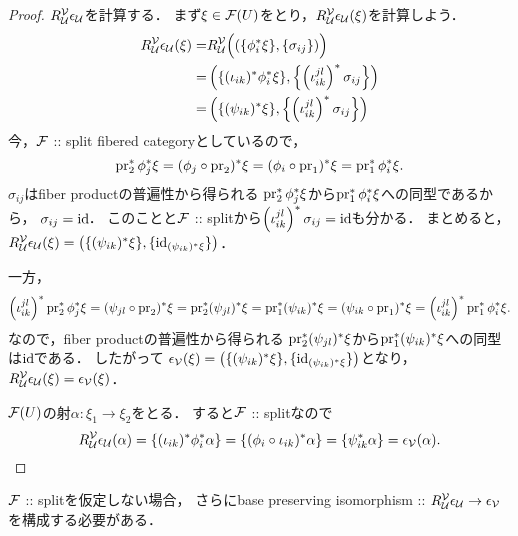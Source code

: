 \documentclass[a4paper, dvipdfmx]{jsarticle}
\begin{document}
\begin{proof}
    $R_{\covU}^{\covV}\epsilon_{\covU}$を計算する．
    まず$\xi \in \stF(U)$をとり，$R_{\covU}^{\covV}\epsilon_{\covU}(\xi)$を計算しよう．
    \begin{align*}
        R_{\covU}^{\covV}\epsilon_{\covU}(\xi)
        =&  R_{\covU}^{\covV}\Big( (\{\phi_i^*\xi\}, \{\sigma_{ij}\}) \Big) \\
        =&  \left(\{(\iota_{ik})^*\phi_i^*\xi\}, \left\{\left(\iota_{ik}^{jl}\right)^*\sigma_{ij} \right\}\right) \\
        =&  \left(\{(\psi_{ik})^*\xi\}, \left\{\left(\iota_{ik}^{jl}\right)^*\sigma_{ij} \right\}\right)
    \end{align*}
    今，$\stF$ :: split fibered categoryとしているので，
    \[ \pr_2^*\phi_j^* \xi=(\phi_j \circ \pr_2)^*\xi=(\phi_i \circ \pr_1)^*\xi=\pr_1^*\phi_i^* \xi. \]
    $\sigma_{ij}$はfiber productの普遍性から得られる
    $\pr_2^*\phi_j^* \xi$から$\pr_1^*\phi_i^* \xi$への同型であるから，
    $\sigma_{ij}=\id$．
    このことと$\stF$ :: splitから$\left(\iota_{ik}^{jl}\right)^*\sigma_{ij}=\id$も分かる．
    まとめると，
    $R_{\covU}^{\covV}\epsilon_{\covU}(\xi)=\left(\{(\psi_{ik})^*\xi\}, \{\id[(\psi_{ik})^*\xi]\}\right)$．

    一方，
    \[
        \left(\iota_{ik}^{jl}\right)^*\pr_2^*\phi_j^* \xi
        =(\psi_{jl} \circ \pr_2)^*\xi
        =\pr_2^*(\psi_{jl})^*\xi
        =\pr_1^*(\psi_{ik})^*\xi
        =(\psi_{ik} \circ \pr_1)^*\xi
        =\left(\iota_{ik}^{jl}\right)^*\pr_1^*\phi_i^* \xi.
    \]
    なので，fiber productの普遍性から得られる
    $\pr_2^*(\psi_{jl})^*\xi$から$\pr_1^*(\psi_{ik})^*\xi$への同型は$\id$である．
    したがって
    $\epsilon_{\covV}(\xi)=\left(\{(\psi_{ik})^*\xi\}, \{\id[(\psi_{ik})^*\xi]\}\right)$となり，
    $R_{\covU}^{\covV}\epsilon_{\covU}(\xi)=\epsilon_{\covV}(\xi)$．
    
    $\stF(U)$の射$\alpha \colon \xi_1 \to \xi_2$をとる．
    すると$\stF$ :: splitなので
    \[
        R_{\covU}^{\covV}\epsilon_{\covU}(\alpha)
        =\{(\iota_{ik})^*\phi_i^*\alpha\}=\{(\phi_i \circ \iota_{ik})^*\alpha\}=\{\psi_{ik}^*\alpha\}
        =\epsilon_{\covV}(\alpha).
    \]
\end{proof}
\begin{Remark}
    $\stF$ :: splitを仮定しない場合，
    さらにbase preserving isomorphism ::
    $R_{\covU}^{\covV}\epsilon_{\covU} \to \epsilon_{\covV}$を構成する必要がある．
\end{Remark}
\end{document}
